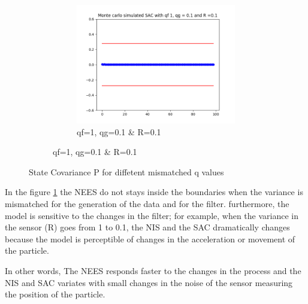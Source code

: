 \documentclass{article}
\begin{document}
\begin{figure}[H]
\begin{subfigure} {1\textwidth}
\begin{subfigure}{.3\textwidth}
                    \includegraphics[width=1\linewidth]{./img/mc/acc/sac1_qg01_r01.png}
                    \caption{qf=1, qg=0.1 \& R=0.1}
                \end{subfigure}
            \end{subfigure} 
            \caption{State Covariance P for diffetent mismatched q values}
            \label{fig:mcMisError}
        \end{figure}

        In the figure \ref{fig:mcMisError} the NEES do not stays inside the boundaries when the variance is mismatched for the
        generation of the data and for the filter. furthermore, the model is sensitive to the changes in the filter; for example,
        when the variance in the sensor (R) goes from 1 to 0.1, the NIS and the SAC dramatically changes because the model is perceptible
        of changes in the acceleration or movement of the particle. 
        
        In other words, The NEES responds faster to the changes in the process and the NIS and SAC variates with small changes in the noise of
        the sensor measuring the position of the particle.

        
        
        \nocite{*}


    
\end{document}
